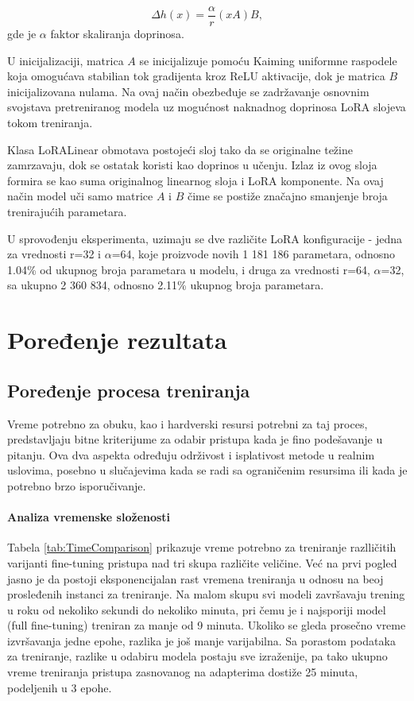 \documentclass[12pt,oneside]{memoir}
\begin{document}
\begin{equation}
	\Delta h(x) = \frac{\alpha}{r} (xA)B,
\end{equation}
gde je \(\alpha\) faktor skaliranja doprinosa. 

U inicijalizaciji, matrica $A$ se inicijalizuje pomoću Kaiming\cite{he2015delving} uniformne raspodele koja omogućava stabilian tok gradijenta kroz ReLU aktivacije, dok je matrica $B$ inicijalizovana nulama. Na ovaj način obezbeđuje se zadržavanje osnovnim svojstava pretreniranog modela uz mogućnost naknadnog doprinosa LoRA slojeva tokom treniranja.

Klasa LoRALinear obmotava postojeći sloj tako da se originalne težine zamrzavaju, dok se ostatak koristi kao doprinos u učenju. Izlaz iz ovog sloja formira se kao suma originalnog linearnog sloja i LoRA komponente. Na ovaj način model uči samo matrice $A$ i $B$ čime se postiže značajno smanjenje broja trenirajućih parametara.

U sprovođenju eksperimenta, uzimaju se dve različite LoRA konfiguracije - jedna za vrednosti r=32 i \(\alpha\)=64, koje proizvode novih 1 181 186 parametara, odnosno 1.04\% od ukupnog broja parametara u modelu, i druga za vrednosti r=64, \(\alpha\)=32, sa ukupno 2 360 834, odnosno 2.11\% ukupnog broja parametara.

\chapter{Poređenje rezultata}

\section{Poređenje procesa treniranja}

Vreme potrebno za obuku, kao i hardverski resursi potrebni za taj proces, predstavljaju bitne kriterijume za odabir pristupa kada je fino podešavanje u pitanju. Ova dva aspekta određuju održivost i isplativost metode u realnim uslovima, posebno u slučajevima kada se radi sa ograničenim resursima ili kada je potrebno brzo isporučivanje.

\subsubsection{Analiza vremenske složenosti}
Tabela \ref{tab:TimeComparison} prikazuje vreme potrebno za treniranje razlličitih varijanti fine-tuning pristupa nad tri skupa različite veličine. Već na prvi pogled jasno je da postoji eksponencijalan rast vremena treniranja u odnosu na beoj prosleđenih instanci za treniranje. Na malom skupu svi modeli završavaju trening u roku od nekoliko sekundi do nekoliko minuta, pri čemu je i najsporiji model (full fine-tuning) treniran za manje od 9 minuta. Ukoliko se gleda prosečno vreme izvršavanja jedne epohe, razlika je još manje varijabilna. Sa porastom podataka za treniranje, razlike u odabiru modela postaju sve izraženije, pa tako ukupno vreme treniranja pristupa zasnovanog na adapterima dostiže 25 minuta, podeljenih u 3 epohe. 
\end{document}
